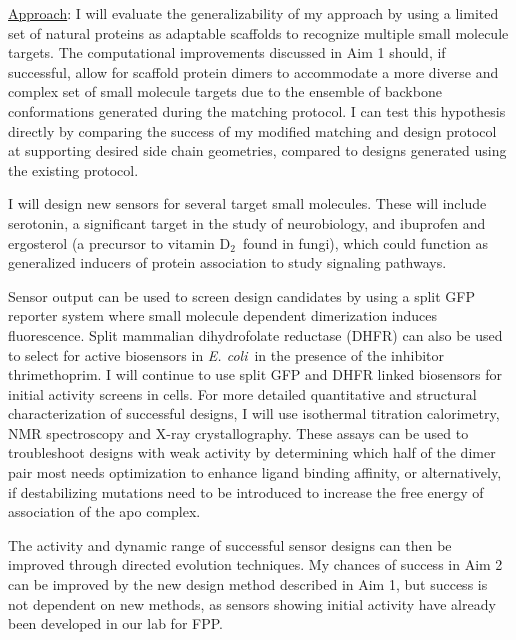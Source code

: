 \noindent
\underline{Approach}:
I will evaluate the generalizability of my approach by using a limited set of natural proteins as adaptable scaffolds to recognize multiple small molecule targets.
The computational improvements discussed in Aim 1 should, if successful, allow for scaffold protein dimers to accommodate a more diverse and complex set of small molecule targets due to the ensemble of backbone conformations generated during the matching protocol.
I can test this hypothesis directly by comparing the success of my modified matching and design protocol at supporting desired side chain geometries, compared to designs generated using the existing protocol.

I will design new sensors for several target small molecules.
These will include serotonin, a significant target in the study of neurobiology, and ibuprofen and ergosterol (a precursor to vitamin D$_2$\ found in fungi), which could function as generalized inducers of protein association to study signaling pathways.

Sensor output can be used to screen design candidates by using a split GFP reporter system where small molecule dependent dimerization induces fluorescence.
Split mammalian dihydrofolate reductase (DHFR) can also be used to select for active biosensors in \textit{E. coli}\ in the presence of the inhibitor thrimethoprim.
I will continue to use split GFP and DHFR linked biosensors for initial activity screens in cells.
For more detailed quantitative and structural characterization of successful designs, I will use isothermal titration calorimetry, NMR spectroscopy and X-ray crystallography.
These assays can be used to troubleshoot designs with weak activity by determining which half of the dimer pair most needs optimization to enhance ligand binding affinity, or alternatively, if destabilizing mutations need to be introduced to increase the free energy of association of the apo complex.

The activity and dynamic range of successful sensor designs can then be improved through directed evolution techniques.
My chances of success in Aim 2 can be improved by the new design method described in Aim 1, but success is not dependent on new methods, as sensors showing initial activity have already been developed in our lab for FPP.
